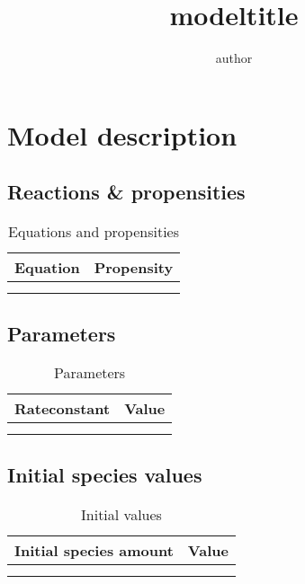 \documentclass[11pt]{article}
\begin{document}
\title{
{{modeltitle}}
}
\author{
{{author}}
}
\maketitle

\section{Model description}
\subsection{Reactions \& propensities}
\begin{table}[h]
    \centering
    \begin{tabular}{l|r}
    Equation & Propensity \\
    \hline
    {%
        {%
            {{cell}}
            {%
               &
            {%
        {%
        \\
    {%
    \end{tabular}
    \caption{Equations and propensities}
    \label{tab:equations}
\end{table}


\subsection{Parameters}
\begin{table}[h]
    \centering
    \begin{tabular}{r|l}
    Rateconstant & Value \\
    \hline
    {%
        {%
            $ 
            {{cell}} 
            $
            {%
               &
            {%
        {%
        \\
    {%
    \end{tabular}
    \caption{Parameters}
    \label{tab:rates}
\end{table}

\subsection{Initial species values}
\begin{table}[h]
    \centering
    \begin{tabular}{r|l}
    Initial species amount & Value \\
    \hline
    {%
        {%
            $ 
            {{cell}} 
            $
            {%
               &
            {%
        {%
        \\
    {%
    \end{tabular}
    \caption{Initial values}
    \label{tab:initialvalues}
\end{table}
\end{document}
